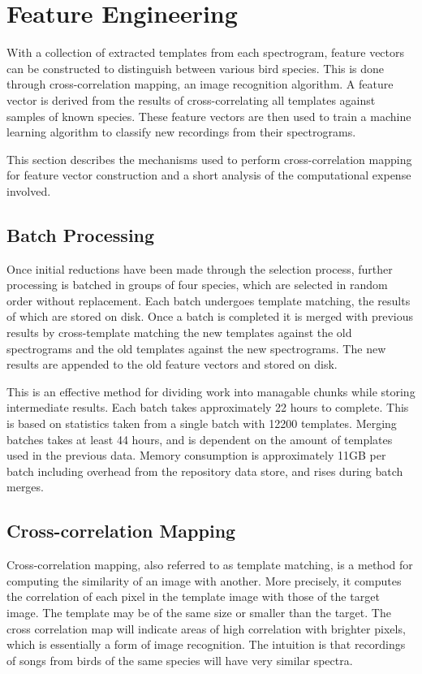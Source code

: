 \section{Feature Engineering}\label{sec:ccm}
With a collection of extracted templates from each spectrogram, feature vectors
can be constructed to distinguish between various bird species.
This is done through cross-correlation mapping, an image recognition algorithm.
A feature vector is derived from the results of cross-correlating all
templates against samples of known species.
These feature vectors are then used to train a machine learning algorithm to
classify new recordings from their spectrograms.

This section describes the mechanisms used to perform cross-correlation mapping
for feature vector construction and a short analysis of the computational
expense involved.

\subsection{Batch Processing}
Once initial reductions have been made through the selection process,
further processing is batched in groups of four species, which are selected in
random order without replacement.
Each batch undergoes template matching, the results of which are stored on disk.
Once a batch is completed it is merged with previous results by cross-template
matching the new templates against the old spectrograms and the old templates
against the new spectrograms.
The new results are appended to the old feature vectors and stored on disk.

This is an effective method for dividing work into managable chunks while storing
intermediate results.
Each batch takes approximately 22 hours to complete.
This is based on statistics taken from a single batch with 12200 templates.
Merging batches takes at least 44 hours, and is dependent on the amount of
templates used in the previous data.
Memory consumption is approximately 11GB per batch including overhead from
the repository data store, and rises during batch merges.

\subsection{Cross-correlation Mapping}
Cross-correlation mapping, also referred to as template matching, is
a method for computing the similarity of an image with another.
More precisely, it computes the correlation of each pixel in the template image
with those of the target image.
The template may be of the same size or smaller than the target.
The cross correlation map will indicate areas of high correlation with brighter
pixels, which is essentially a form of image recognition.
The intuition is that recordings of songs from birds of the same species will
have very similar spectra.


